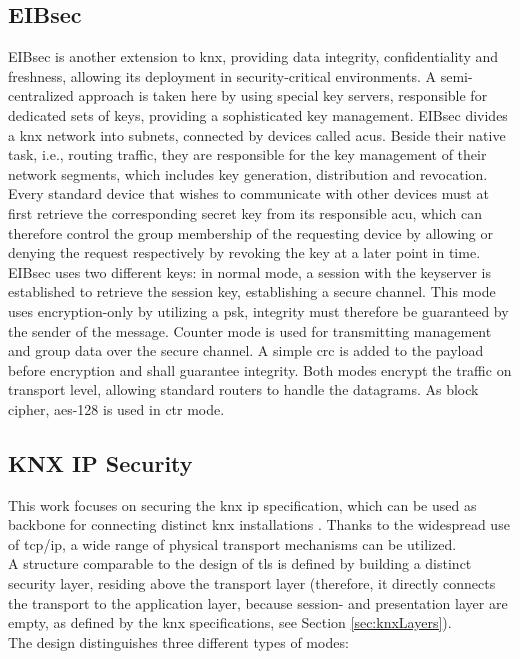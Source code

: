 \subsection{EIBsec}

EIBsec is another extension to \gls{knx}, providing data integrity, confidentiality and freshness, allowing its deployment in security-critical environments.
A semi-centralized approach is taken here by using special key servers, responsible for dedicated sets
of keys, providing a sophisticated key management. EIBsec divides a \gls{knx} network into subnets, connected by devices called \glspl{acu}. Beside their native
task, i.e., routing traffic, they
 are responsible for the key management of their network segments, which includes key generation, distribution and revocation. Every standard device that
 wishes to communicate with other devices must at first retrieve the corresponding secret key from its responsible \gls{acu}, which can therefore control the
 group membership of the requesting device by allowing or denying the request respectively by revoking the key at a later point in time.
\\
EIBsec uses two different keys: in normal mode, a session with the keyserver is established to retrieve the session key, establishing a secure channel.
This mode uses encryption-only by utilizing a \gls{psk}, integrity must therefore be guaranteed by the sender of the message. Counter mode is used for transmitting management and
group data over the secure channel. A simple \gls{crc} is added to the payload before encryption and shall guarantee integrity. Both modes encrypt the traffic
on transport level, allowing standard routers to handle the datagrams. As block cipher, \gls{aes}-128 is used in \gls{ctr} mode.

\subsection{KNX IP Security}

This work \cite{WG2009a} focuses on securing the \gls{knx} \gls{ip} specification, which can be used as backbone for connecting distinct \gls{knx} installations \cite{5195839}.
Thanks to the widespread use of \gls{tcp}/\gls{ip}, a wide range of physical transport mechanisms can be utilized.
\\
A structure comparable to the design of \gls{tls} is defined by building a distinct security layer, residing above the transport layer (therefore, it directly
connects the transport to the application layer, because session- and presentation layer are empty, as defined by the \gls{knx} specifications, see Section
\ref{sec:knxLayers}).
\\
The design distinguishes three different types of modes: 

